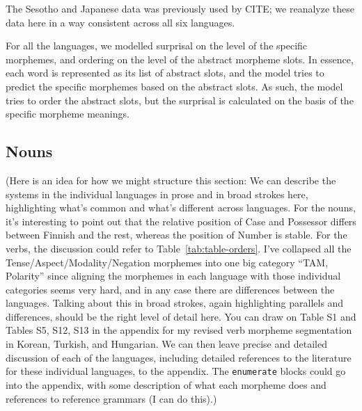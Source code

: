 \documentclass[11pt,letterpaper]{article}
\newcommand\mhahn[1]{{\color{red}(#1)}}
\begin{document}
\begin{itemize}
The Sesotho and Japanese data was previously used by CITE; we reanalyze these data here in a way consistent across all six languages.

For all the languages, we modelled surprisal on the level of the specific morphemes, and ordering on the level of the abstract morpheme slots. In essence, each word is represented as its list of abstract slots, and the model tries to predict the specific morphemes based on the abstract slots. As such, the model tries to order the abstract slots, but the surprisal is calculated on the basis of the specific morpheme meanings.


\end{itemize}


\subsection{Nouns}

\mhahn{Here is an idea for how we might structure this section: We can describe the systems in the individual languages in prose and in broad strokes here, highlighting what's common and what's different across languages. For the nouns, it's interesting to point out that the relative position of Case and Possessor differs between Finnish and the rest, whereas the position of Number is stable. For the verbs, the discussion could refer to Table~\ref{tab:table-orders}. I've collapsed all the Tense/Aspect/Modality/Negation morphemes into one big category ``TAM, Polarity'' since aligning the morphemes in each language with those individual categories seems very hard, and in any case there are differences between the languages. Talking about this in broad strokes, again highlighting parallels and differences, should be the right level of detail here. You can draw on Table S1 and Tables S5, S12, S13 in the appendix for my revised verb morpheme segmentation in Korean, Turkish, and Hungarian. We can then leave precise and detailed discussion of each of the languages, including detailed references to the literature for these individual languages, to the appendix. The \texttt{enumerate} blocks could go into the appendix, with some description of what each morpheme does and references to reference grammars (I can do this).}
\end{document}
